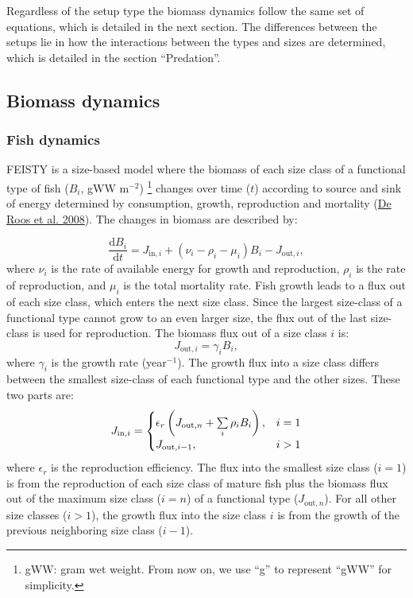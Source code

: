 \documentclass[
]{article}
\begin{document}
Regardless of the setup type the biomass dynamics follow the same set of
equations, which is detailed in the next section. The differences
between the setups lie in how the interactions between the types and
sizes are determined, which is detailed in the section ``Predation''.

\hypertarget{biomass-dynamics}{%
\subsection{Biomass dynamics}\label{biomass-dynamics}}

\hypertarget{fish-dynamics}{%
\subsubsection{Fish dynamics}\label{fish-dynamics}}

FEISTY is a size-based model where the biomass of each size class of a
functional type of fish (\(B_i\), gWW m\(^{-2}\)) \footnote{gWW: gram
  wet weight. From now on, we use ``g'' to represent ``gWW'' for
  simplicity.} changes over time (\(t\)) according to source and sink of
energy determined by consumption, growth, reproduction and mortality
(\protect\hyperlink{ref-deRoos2008}{De Roos et al. 2008}). The changes
in biomass are described by:

\begin{equation}
\dfrac{\mathrm{d}B_{i}}{\mathrm{d}t} =  J_{\mathrm{in},i}  + (\nu_{i} - \rho_i -\mu_i)B_i - J_{\mathrm{out},i},
\end{equation} where \(\nu_{i}\) is the rate of available energy for
growth and reproduction, \(\rho_i\) is the rate of reproduction, and
\(\mu_i\) is the total mortality rate. Fish growth leads to a flux out
of each size class, which enters the next size class. Since the largest
size-class of a functional type cannot grow to an even larger size, the
flux out of the last size-class is used for reproduction. The biomass
flux out of a size class \(i\) is: \begin{equation}
J_{\mathrm{out},i} = \gamma_i B_i,
\end{equation} where \(\gamma_i\) is the growth rate (year\(^{-1}\)).
The growth flux into a size class differs between the smallest
size-class of each functional type and the other sizes. These two parts
are: \begin{equation}
    J_{\mathrm{in},i} =
  \begin{cases}
\epsilon_r \left(  J_{\mathrm{out},n} + \sum\limits_i \rho_i B_i \right),      & \text{$ i=1 $} \\
     J_{\mathrm{out},i-1}, & \text{$ i > 1$} 
  \end{cases}
\end{equation} where \(\epsilon_r\) is the reproduction efficiency. The
flux into the smallest size class (\(i=1\)) is from the reproduction of
each size class of mature fish plus the biomass flux out of the maximum
size class (\(i=n\)) of a functional type (\(J_{\mathrm{out},n}\)). For
all other size classes (\(i > 1\)), the growth flux into the size class
\(i\) is from the growth of the previous neighboring size class
(\(i-1\)).
\end{document}
